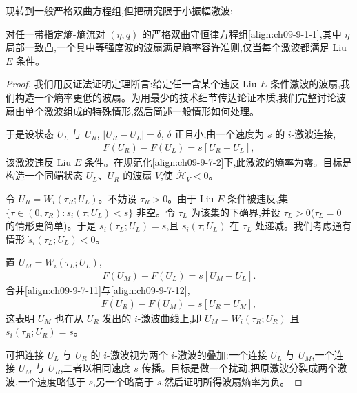 \documentclass[../../main.tex]{subfiles}
\begin{document}
现转到一般严格双曲方程组,但把研究限于小振幅激波:

\begin{theorem}\label{theorem:ch09-熵率蕴含liu}
对任一带指定熵-熵流对 $(\eta,q)$ 的严格双曲守恒律方程组\eqref{align:ch09-9-1-1},其中 $\eta$ 局部一致凸,一个具中等强度波的波扇满足熵率容许准则,仅当每个激波都满足 Liu $E$ 条件。
\end{theorem}

\begin{proof}
我们用反证法证明定理断言:给定任一含某个违反 Liu $E$ 条件激波的波扇,我们构造一个熵率更低的波扇。为用最少的技术细节传达论证本质,我们完整讨论波扇由单个激波组成的特殊情形,然后简述一般情形如何处理。

于是设状态 $U_{L}$ 与 $U_{R}$, $|U_{R}-U_{L}|=\delta$, $\delta$ 正且小,由一个速度为 $s$ 的 $i$-激波连接,
\begin{align}
F(U_{R})-F(U_{L})=s[U_{R}-U_{L}],
\label{align:ch09-9-7-11}
\end{align}
该激波违反 Liu $E$ 条件。在规范化\eqref{align:ch09-9-7-2}下,此激波的熵率为零。目标是构造一个同端状态 $U_{L}$、$U_{R}$ 的波扇 $V$,使 $\dot{\mathscr{H}}_{V}<0$。

令 $U_{R}=W_{i}(\tau_{R};U_{L})$。不妨设 $\tau_{R}>0$。由于 Liu $E$ 条件被违反,集 $\{\tau\in(0,\tau_{R}):s_{i}(\tau;U_{L})<s\}$ 非空。令 $\tau_{L}$ 为该集的下确界,并设 $\tau_{L}>0$($\tau_{L}=0$ 的情形更简单)。于是 $s_{i}(\tau_{L};U_{L})=s$,且 $s_{i}(\tau;U_{L})$ 在 $\tau_{L}$ 处递减。我们考虑通有情形 $\dot{s}_{i}(\tau_{L};U_{L})<0$。

置 $U_{M}=W_{i}(\tau_{L};U_{L})$,
\begin{align}
F(U_{M})-F(U_{L})=s[U_{M}-U_{L}].
\label{align:ch09-9-7-12}
\end{align}
合并\eqref{align:ch09-9-7-11}与\eqref{align:ch09-9-7-12},
\begin{align}
F(U_{R})-F(U_{M})=s[U_{R}-U_{M}],
\label{align:ch09-9-7-13}
\end{align}
这表明 $U_{M}$ 也在从 $U_{R}$ 发出的 $i$-激波曲线上,即 $U_{M}=W_{i}(\tau_{R};U_{R})$ 且 $s_{i}(\tau_{R};U_{R})=s$。

可把连接 $U_{L}$ 与 $U_{R}$ 的 $i$-激波视为两个 $i$-激波的叠加:一个连接 $U_{L}$ 与 $U_{M}$,一个连接 $U_{M}$ 与 $U_{R}$,二者以相同速度 $s$ 传播。目标是做一个扰动,把原激波分裂成两个激波,一个速度略低于 $s$,另一个略高于 $s$,然后证明所得波扇熵率为负。


\end{proof}
\end{document}
